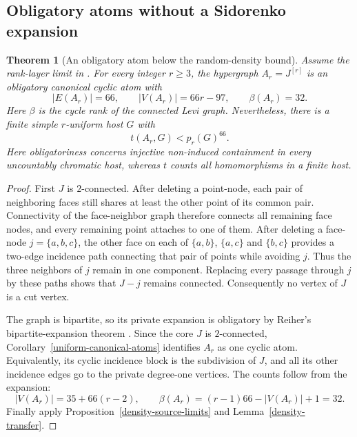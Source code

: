 \documentclass[a4paper,11pt,reqno]{amsart}
\theoremstyle{plain}
\newtheorem{theorem}{Theorem}[section]
\theoremstyle{definition}
\theoremstyle{remark}
\begin{document}
\subsection{Obligatory atoms without a Sidorenko expansion}

\begin{theorem}[An obligatory atom below the random-density bound]
\label{density-obligatory-atom}
Assume the rank-layer limit in \citep[Section~3]{openai161}.
For every integer $r\ge3$, the hypergraph $A_r=J^{[r]}$ is an
obligatory canonical cyclic atom with
\[
 |E(A_r)|=66,\qquad |V(A_r)|=66r-97,\qquad
 \beta(A_r)=32.
\]
Here $\beta$ is the cycle rank of the connected Levi graph.
Nevertheless, there is a finite simple $r$-uniform host $G$ with
\[
 t(A_r,G)<p_r(G)^{66}.
\]
Here obligatoriness concerns injective non-induced containment in
every uncountably chromatic host, whereas $t$ counts all
homomorphisms in a finite host.
\end{theorem}
\begin{proof}
First $J$ is $2$-connected.
After deleting a point-node, each pair of neighboring faces still
shares at least the other point of its common pair.  Connectivity
of the face-neighbor graph therefore connects all remaining face
nodes, and every remaining point attaches to one of them.
After deleting a face-node $j=\{a,b,c\}$, the other face on each of
$\{a,b\}$, $\{a,c\}$ and $\{b,c\}$ provides a two-edge incidence
path connecting that pair of points while avoiding $j$.
Thus the three neighbors of $j$ remain in one component.
Replacing every passage through $j$ by these paths shows that
$J-j$ remains connected.
Consequently no vertex of $J$ is a cut vertex.

The graph is bipartite, so its private expansion is obligatory by
Reiher's bipartite-expansion theorem \cite[Theorem 1.2]{reiher2024}.
Since the core $J$ is $2$-connected,
Corollary~\ref{uniform-canonical-atoms} identifies $A_r$ as one
cyclic atom.  Equivalently, its cyclic incidence block is the
subdivision of $J$, and all its other incidence edges go to the
private degree-one vertices.
The counts follow from the expansion:
\[
 |V(A_r)|=35+66(r-2),\qquad
 \beta(A_r)=(r-1)66-|V(A_r)|+1=32.
\]
Finally apply Proposition~\ref{density-source-limits} and
Lemma~\ref{density-transfer}.
\end{proof}
\end{document}
